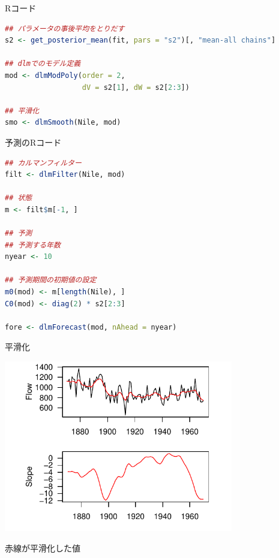 \documentclass[dvipdfmx,12pt]{beamer}
\begin{document}
\begin{frame}[fragile]{Rコード}
  \begin{lstlisting}[language=R]
## パラメータの事後平均をとりだす
s2 <- get_posterior_mean(fit, pars = "s2")[, "mean-all chains"]

## dlmでのモデル定義
mod <- dlmModPoly(order = 2,
                  dV = s2[1], dW = s2[2:3])

## 平滑化
smo <- dlmSmooth(Nile, mod)
  \end{lstlisting}
\end{frame}

\begin{frame}[fragile]{予測のRコード}
  \begin{lstlisting}[language=R]
## カルマンフィルター
filt <- dlmFilter(Nile, mod)

## 状態
m <- filt$m[-1, ]

## 予測
## 予測する年数
nyear <- 10

## 予測期間の初期値の設定
m0(mod) <- m[length(Nile), ]
C0(mod) <- diag(2) * s2[2:3]

fore <- dlmForecast(mod, nAhead = nyear)
  \end{lstlisting}
\end{frame}

\begin{frame}{平滑化}
  \begin{center}
    \includegraphics[width=10cm]{dlm2_smooth}
  \end{center}

  赤線が平滑化した値
\end{frame}
\end{document}
